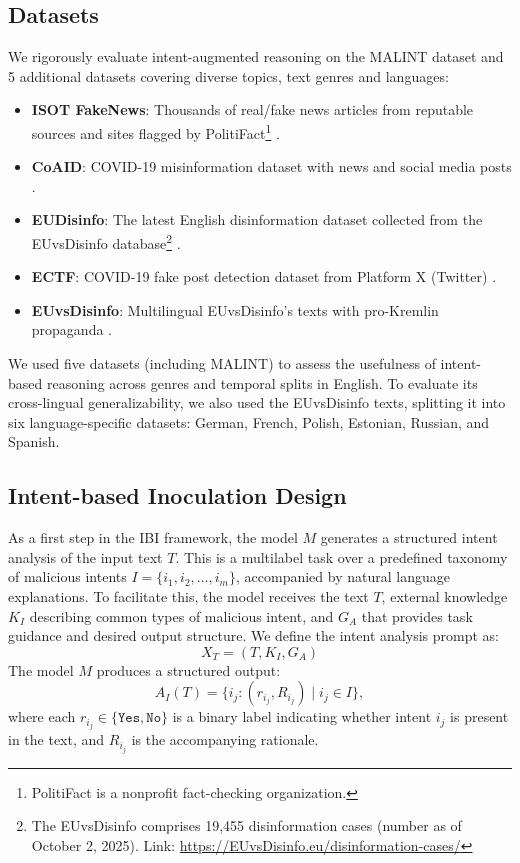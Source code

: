\documentclass[11pt]{article}
\begin{document}
\subsection{Datasets}
We rigorously evaluate intent-augmented reasoning on the MALINT dataset and 5 additional datasets covering diverse topics, text genres and languages:
\begin{itemize}[nosep, leftmargin=*]
\item \textbf{ISOT FakeNews}: Thousands of real/fake news articles from reputable sources and sites flagged by PolitiFact\footnote{PolitiFact is a nonprofit fact-checking organization.} \cite{ahmed2018detecting, ahmed2017detection}.
\item \textbf{CoAID}: COVID-19 misinformation dataset with news and social media posts \cite{cui2020coaid}.
\item \textbf{EUDisinfo}: The latest English disinformation dataset collected from the EUvsDisinfo database\footnote{The EUvsDisinfo comprises 19,455 disinformation cases (number as of October 2, 2025). Link: \url{https://EUvsDisinfo.eu/disinformation-cases/}} \cite{modzelewski2025pcot}.
\item \textbf{ECTF}: COVID-19 fake post detection dataset from Platform X (Twitter) \cite{bansal2021combining}.
\item \textbf{EUvsDisinfo}: Multilingual EUvsDisinfo's texts with pro-Kremlin propaganda \cite{leite2024euvsdisinfo}.
\end{itemize}

We used five datasets (including MALINT) to assess the usefulness of intent-based reasoning across genres and temporal splits in English. To evaluate its cross-lingual generalizability, we also used the EUvsDisinfo texts, splitting it into six language-specific datasets: German, French, Polish, Estonian, Russian, and Spanish.

\subsection{Intent-based Inoculation Design}
\label{subsec:ibi_design}

As a first step in the IBI framework, the model  \( M \) generates a structured intent analysis of the input text \( T \). This is a multilabel task over a predefined taxonomy of malicious intents \( I = \{i_1, i_2, \ldots, i_m\} \), accompanied by natural language explanations. To facilitate this, the model receives the text \( T \), external knowledge \( K_I \) describing common types of malicious intent, and \( G_A \) that provides task guidance and desired output structure. We define the intent analysis prompt as:
\begin{equation}
X_T = (T, K_I, G_A)
\end{equation}
The model \( M \) produces a structured output:
\begin{equation}
A_I(T) = \{i_j : (r_{i_j}, R_{i_j}) \mid i_j \in I\},
\end{equation}
where each \( r_{i_j} \in \{\texttt{Yes}, \texttt{No}\} \) is a binary label indicating whether intent \( i_j \) is present in the text, and \( R_{i_j} \) is the accompanying rationale.
\end{document}
